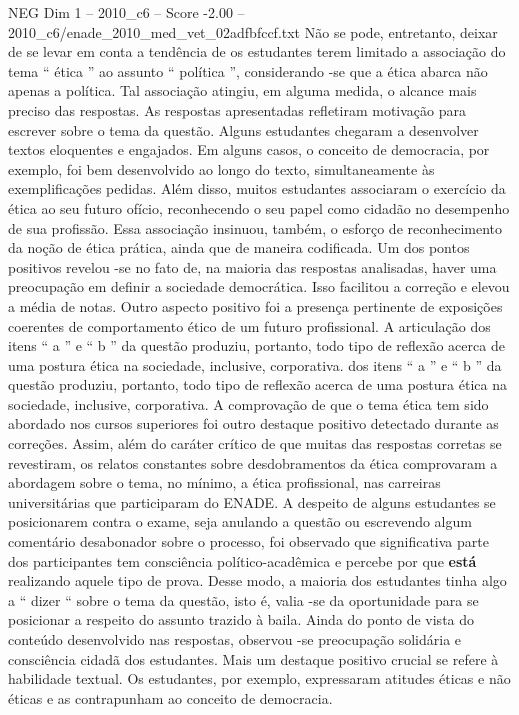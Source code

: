 \begin{textsample}{NEG Dim 1 – 2010\_c6 – Score -2.00 – 2010\_c6/enade\_2010\_med\_vet\_02adfbfccf.txt}
Não se pode, entretanto, deixar de se levar em conta a tendência de os estudantes terem limitado a associação do tema “ ética ” ao assunto “ política ”, considerando -se que a ética abarca não apenas a política.
Tal associação atingiu, em alguma medida, o alcance mais preciso das respostas.
As respostas apresentadas refletiram motivação para escrever sobre o tema da questão.
Alguns estudantes chegaram a desenvolver textos eloquentes e engajados.
Em alguns casos, o conceito de democracia, por exemplo, foi bem desenvolvido ao longo do texto, simultaneamente às exemplificações pedidas.
Além disso, muitos estudantes associaram o exercício da ética ao seu futuro ofício, reconhecendo o seu papel como cidadão no desempenho de sua profissão.
Essa associação insinuou, também, o esforço de reconhecimento da noção de ética prática, ainda que de maneira codificada.
Um dos pontos positivos revelou -se no fato de, na maioria das respostas analisadas, haver uma preocupação em definir a sociedade democrática.
Isso facilitou a correção e elevou a média de notas.
Outro aspecto positivo foi a presença pertinente de exposições coerentes de comportamento ético de um futuro profissional.
A articulação dos itens “ a ” e “ b ” da questão produziu, portanto, todo tipo de reflexão acerca de uma postura ética na sociedade, inclusive, corporativa. dos itens “ a ” e “ b ” da questão produziu, portanto, todo tipo de reflexão acerca de uma postura ética na sociedade, inclusive, corporativa.
A comprovação de que o tema ética tem sido abordado nos cursos superiores foi outro destaque positivo detectado durante as correções.
Assim, além do caráter crítico de que muitas das respostas corretas se revestiram, os relatos constantes sobre desdobramentos da ética comprovaram a abordagem sobre o tema, no mínimo, a ética profissional, nas carreiras universitárias que participaram do ENADE.
A despeito de alguns estudantes se posicionarem contra o exame, seja anulando a questão ou escrevendo algum comentário desabonador sobre o processo, foi observado que significativa parte dos participantes tem consciência político-acadêmica e percebe por que \textbf{está} realizando aquele tipo de prova.
Desse modo, a maioria dos estudantes tinha algo a “ dizer “ sobre o tema da questão, isto é, valia -se da oportunidade para se posicionar a respeito do assunto trazido à baila.
Ainda do ponto de vista do conteúdo desenvolvido nas respostas, observou -se preocupação solidária e consciência cidadã dos estudantes.
Mais um destaque positivo crucial se refere à habilidade textual.
Os estudantes, por exemplo, expressaram atitudes éticas e não éticas e as contrapunham ao conceito de democracia.

\end{textsample}
